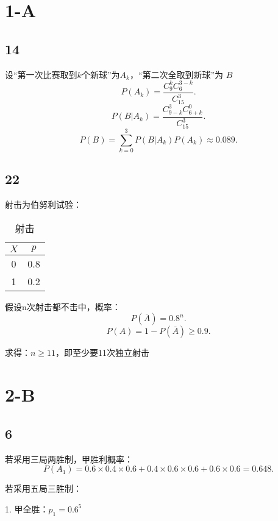 \def\lecturer{LiManMan}
\def\noter{THF}
\def\className{Statistics}
\def\term{III-B}



\section*{1-A}%
\label{sec:1-A}
\subsection*{14}%
\label{sub:14}
设“第一次比赛取到$k$个新球”为$A_k$，“第二次全取到新球”为 $B$ 
 \[
    P\left( A_k \right) =\frac{C_{9}^{k}C_{6}^{3-k}}{C_{15}^{3}}
.\] 
\[
    P\left( B|A_k \right) =\frac{C_{9-k}^{3}C_{6+k}^{0}}{C_{15}^{3}}
.\] 
\[
    P\left( B \right) =\sum_{k=0}^{3} P\left( B|A_k \right)P\left( A_k \right)  \approx 0.089
.\] 
\subsection*{22}%
\label{sub:22}
射击为伯努利试验：
\begin{table}[htpb]
    \centering
    \caption{射击}
    \label{tab:射击}
    \begin{tabular}{cc}
    \toprule
    $X$ & $p$\\
    \midrule
    0 & 0.8\\
    1 & 0.2\\
    \bottomrule
    \end{tabular}
\end{table}

假设n次射击都不击中，概率：
\[
    P\left( \bar{A} \right) =0.8^n
.\] 
\[
    P\left( A \right) =1-P\left( \bar{A} \right) \ge 0.9
.\] 

求得：$n\ge 11$，即至少要11次独立射击
\section*{2-B}%
\label{sec:2-B}
\subsection*{6}%
\label{sub:6}
若采用三局两胜制，甲胜利概率：
\[
    P\left( A_1 \right) =0.6\times 0.4\times 0.6+0.4\times 0.6\times 0.6+0.6\times 0.6=0.648
.\] 

若采用五局三胜制：

1. 甲全胜：$p_1=0.6^{5}$ 


